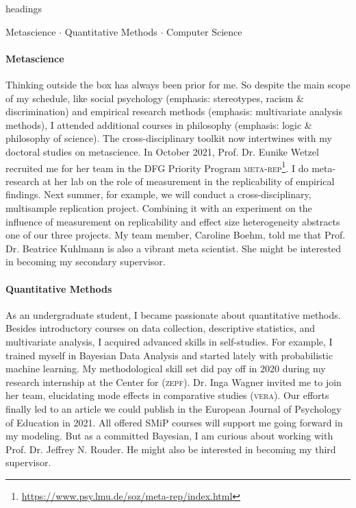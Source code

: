 \documentclass[11pt]{FreemanML}
\begin{document}
\begin{color}{headings}
	\begin{center}
		Metascience $\cdot$ Quantitative Methods $\cdot$ Computer Science
	\end{center}
\end{color}
\vspace{-0.2cm}

\paragraph{Metascience}

Thinking outside the box has always been prior for me. So despite the main
scope of my schedule, like social psychology (emphasis: stereotypes, racism \&
discrimination) and empirical research methods (emphasis: multivariate analysis
methods), I attended additional courses in philosophy (emphasis: logic \&
philosophy of science). The cross-disciplinary toolkit now intertwines with my
doctoral studies on metascience. In October 2021, Prof. Dr. Eunike Wetzel
recruited me for her team in the DFG Priority Program
\textsc{meta-rep}\footnote{\url{https://www.psy.lmu.de/soz/meta-rep/index.html}}. I do
meta-research at her lab on the role of measurement in the replicability of
empirical findings. Next summer, for example, we will conduct a
cross-disciplinary, multisample replication project. Combining it with an
experiment on the influence of measurement on replicability and effect size
heterogeneity abstracts one of our three projects. My team member, Caroline
Boehm, told me that Prof. Dr. Beatrice Kuhlmann is also a vibrant meta
scientist. She might be interested in becoming my secondary supervisor.

\paragraph{Quantitative Methods}

As an undergraduate student, I became passionate about quantitative methods.
Besides introductory courses on data collection, descriptive statistics, and
multivariate analysis, I acquired advanced skills in self-studies. For example,
I trained myself in Bayesian Data Analysis and started lately with
probabilistic machine learning. My methodological skill set did pay off in 2020
during my research internship at the Center for (\textsc{zepf}). Dr. Inga
Wagner invited me to join her team, elucidating mode effects in comparative
studies (\textsc{vera}). Our efforts finally led to an article we could publish in the
European Journal of Psychology of Education in 2021. All offered SMiP courses
will support me going forward in my modeling. But as a committed Bayesian, I am
curious about working with Prof. Dr. Jeffrey N. Rouder. He might also be
interested in becoming my third supervisor.
\end{document}
